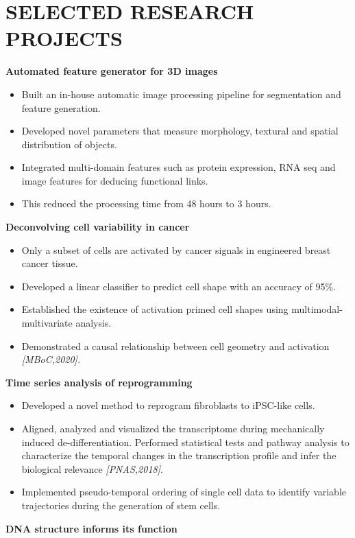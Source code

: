 \documentclass[letterpaper,11pt]{article}
\begin{document}
\section{\bf SELECTED RESEARCH PROJECTS}
{\bf Automated feature generator for 3D images}
\begin{itemize}
    \item Built an in-house automatic image processing pipeline for segmentation and feature generation.
    \item Developed novel parameters that measure morphology, textural and spatial distribution of objects.
     \item Integrated multi-domain features such as protein expression, RNA seq and image features for deducing functional links. 
    \item This reduced the processing time from 48 hours to 3 hours. 
\end{itemize}
\vspace{1mm}
{\bf Deconvolving cell variability in cancer}
\begin{itemize}
    \item Only a subset of cells are activated by cancer signals in engineered breast cancer tissue.
     \item Developed a linear classifier to predict cell shape with an accuracy of 95\%.
     \item Established the existence of activation primed cell shapes using multimodal-multivariate analysis.
    \item Demonstrated a causal relationship between cell geometry and activation \em {[MBoC,2020]}.
\end{itemize}
\vspace{1mm}
{\bf Time series analysis of reprogramming}
\begin{itemize}
    \item Developed a novel method to reprogram fibroblasts to iPSC-like cells.
    \item Aligned, analyzed and visualized the transcriptome during mechanically induced de-differentiation. Performed statistical tests and pathway analysis to characterize the temporal changes in the transcription profile and infer the biological relevance \emph {[PNAS,2018]}.
    \item Implemented pseudo-temporal ordering of single cell data to identify variable trajectories during the generation of stem cells. 
\end{itemize}
\vspace{1mm}
{\bf DNA structure informs its function}
\end{document}
